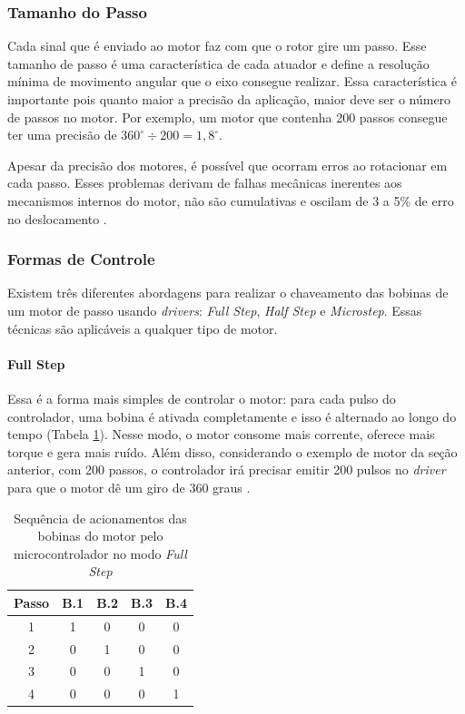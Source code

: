 \subsubsection{Tamanho do Passo}
Cada sinal que é enviado ao motor faz com que o rotor gire um passo. Esse tamanho de passo é uma característica de cada atuador e define a resolução mínima de movimento angular que o eixo consegue realizar. Essa característica é importante pois quanto maior a precisão da aplicação, maior deve ser o número de passos no motor. Por exemplo, um motor que contenha 200 passos consegue ter uma precisão de $ 360^{\circ} \div 200 = 1,8 ^{\circ} $.

Apesar da precisão dos motores, é possível que ocorram erros ao rotacionar em cada passo. Esses problemas derivam de falhas mecânicas inerentes aos mecanismos internos do motor, não são cumulativas e oscilam de 3 a 5\% de erro no deslocamento \cite{man:advancedmicrosystemStepControl}.

\subsubsection{Formas de Controle}
Existem três diferentes abordagens para realizar o chaveamento das bobinas de um motor de passo usando \textit{drivers}: \textit{Full Step}, \textit{Half Step} e \textit{Microstep}. Essas técnicas são aplicáveis a qualquer tipo de motor.

\paragraph{Full Step}
Essa é a forma mais simples de controlar o motor: para cada pulso do controlador, uma bobina é ativada completamente e isso é alternado ao longo do tempo (Tabela \ref{tab:fs}). Nesse modo, o motor consome mais corrente, oferece mais torque e gera mais ruído. Além disso, considerando o exemplo de motor da seção anterior, com 200 passos, o controlador irá precisar emitir 200 pulsos no \textit{driver} para que o motor dê um giro de 360 graus \cite{man:advancedmicrosystemStepControl}.

\begin{table}[!htb]
	\centering
	\caption{Sequência de acionamentos das bobinas do motor pelo microcontrolador no modo \textit{Full Step}}
	\begin{tabular}{c|c|c|c|c}
		Passo & B.1 & B.2 & B.3 & B.4 \\\hline
		1	& 1 & 0 & 0 & 0\\
		2	& 0 & 1 & 0 & 0\\
		3	& 0 & 0 & 1 & 0\\
		4	& 0 & 0	& 0 & 1		\\
	\end{tabular}
	\label{tab:fs}
\end{table}


